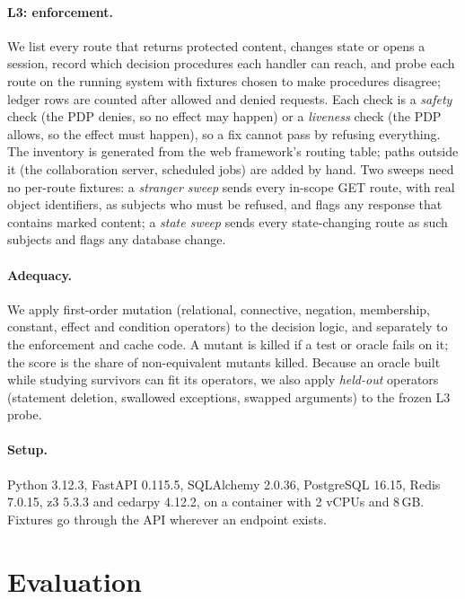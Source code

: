 \documentclass[sigconf,review,anonymous]{acmart}
\begin{document}
\paragraph{L3: enforcement.} We list every route that returns protected content, changes state or opens a session,
record which decision procedures each handler can reach, and probe each route on the running system with fixtures
chosen to make procedures disagree; ledger rows are counted after allowed and denied requests. Each check is a
\emph{safety} check (the PDP denies, so no effect may happen) or a \emph{liveness} check (the PDP allows, so the
effect must happen), so a fix cannot pass by refusing everything. The inventory is generated from the web
framework's routing table; paths outside it (the collaboration server, scheduled jobs) are added by hand. Two
sweeps need no per-route fixtures: a \emph{stranger sweep} sends every in-scope GET route, with real object
identifiers, as subjects who must be refused, and flags any response that contains marked content; a \emph{state
sweep} sends every state-changing route as such subjects and flags any database change.

\paragraph{Adequacy.} We apply first-order mutation (relational, connective, negation, membership, constant, effect
and condition operators) to the decision logic, and separately to the enforcement and cache code. A mutant is
killed if a test or oracle fails on it; the score is the share of non-equivalent mutants killed. Because an oracle
built while studying survivors can fit its operators, we also apply \emph{held-out} operators (statement deletion,
swallowed exceptions, swapped arguments) to the frozen L3 probe.

\paragraph{Setup.} Python 3.12.3, FastAPI 0.115.5, SQLAlchemy 2.0.36, PostgreSQL 16.15, Redis 7.0.15, z3 5.3.3 and
cedarpy 4.12.2, on a container with 2 vCPUs and 8\,GB. Fixtures go through the API wherever an endpoint exists.

\section{Evaluation}
\label{sec:eval}
\end{document}
